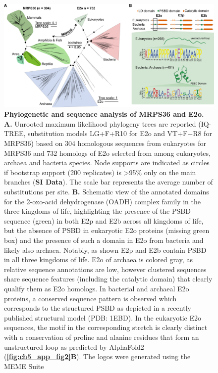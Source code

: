 \begin{figure}[hbt!]
\centering
\includegraphics[width=\textwidth]{Chapter.5/Figures/Figure3_new_mrps36_tree.png}
\caption{\textbf{Phylogenetic and sequence analysis of MRPS36 and E2o.} \textbf{A.} Unrooted maximum likelihood phylogeny trees are reported (IQ-TREE, substitution models LG+F+R10 for E2o and VT+F+R8 for MRPS36) based on 304 homologous sequences from eukaryotes for MRPS36 and 732 homologs of E2o selected from among eukaryotes, archaea and bacteria species. Node supports are indicated as circles if bootstrap support (200 replicates) is >95\% only on the main branches (\textbf{SI Data}). The scale bar represents the average number of substitutions per site. \textbf{B.} Schematic view of the annotated domains for the 2-oxo-acid dehydrogenase (OADH) complex family in the three kingdoms of life, highlighting the presence of the PSBD sequence (green) in both E2p and E2b across all kingdoms of life, but the absence of PSBD in eukaryotic E2o proteins (missing green box) and the presence of such a domain in E2o from bacteria and likely also archaea. Notably, as shown E2p and E2b contain PSBD in all three kingdoms of life. E2o of archaea is colored gray, as relative sequence annotations are low, however clustered sequences share sequence features (including the catalytic domain) that clearly qualify them as E2o homologs. In bacterial and archaeal E2o proteins, a conserved sequence pattern is observed which corresponds to the structured PSBD as depicted in a recently published structural model \cite{Mande_1996} (PDB: 1EBD). In the eukaryotic E2o sequences, the motif in the corresponding stretch is clearly distinct with a conservation of proline and alanine residues that form an unstructured loop as predicted by AlphaFold2 (\textbf{\autoref{fig:ch5_app_fig2}B}). The logos were generated using the MEME Suite \cite{Bailey_2015}}
\label{fig:ch5_fig3}
\end{figure}
\clearpage

